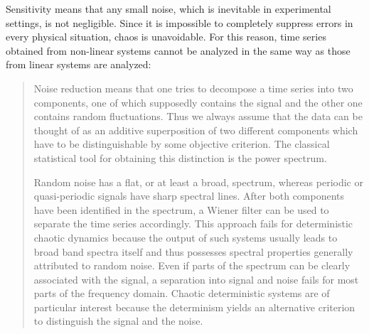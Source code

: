 \documentclass[10pt,twoside]{book}
\begin{document}
Sensitivity means that any small noise, which is inevitable in experimental settings, is not negligible.
Since it is impossible to completely suppress errors in every physical situation, chaos is unavoidable.
For this reason, time series obtained from non-linear systems cannot be analyzed in the same way as those from linear systems are analyzed: 
\begin{quotation}
  Noise reduction means that one tries to decompose a time series into two components, one of which supposedly contains the signal and the other one contains random fluctuations.
  Thus we always assume that the data can be thought of as an additive superposition of two different components which have to be distinguishable by some objective criterion.
  The classical statistical tool for obtaining this distinction is the power spectrum.

  Random noise has a flat, or at least a broad, spectrum, whereas periodic or quasi-periodic signals have sharp spectral lines.
  After both components have been identified in the spectrum, a Wiener filter can be used to separate the time series accordingly.
  This approach fails for deterministic chaotic dynamics because the output of such systems usually leads to broad band spectra itself and thus possesses spectral properties generally attributed to random noise.
  Even if parts of the spectrum can be clearly associated with the signal, a separation into signal and noise fails for most parts of the frequency domain.
  Chaotic deterministic systems are of particular interest because the determinism yields an alternative criterion to distinguish the signal and the noise. 
  \citep[p.51]{kantz-schreiber}
\end{quotation}
\end{document}
